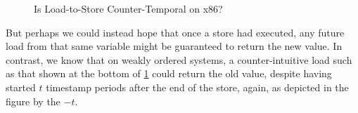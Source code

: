 {\begin{figure}
\centering
{}
\caption{Is Load-to-Store Counter-Temporal on x86?}
\label{fig:memorder:Is Load-to-Store Counter-Temporal on x86?}
\end{figure}

	But perhaps we could instead hope that once a store had
	executed, any future load from that same variable might
	be guaranteed to return the new value.
	In contrast, we know that on weakly ordered systems, a
	counter-intuitive load such as that shown at the bottom
	of
	\cref{fig:memorder:Is Load-to-Store Counter-Temporal on x86?}
	could return the old value, despite having started $t$
	timestamp periods after the end of the store, again, as
	depicted in the figure by the $-t$.

}
